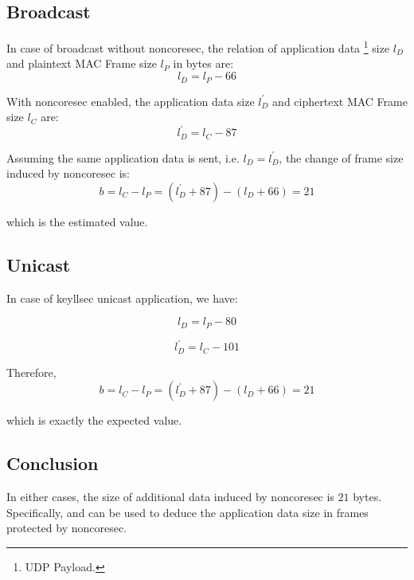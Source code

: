 \subsection{Broadcast}
In case of broadcast without noncoresec, the relation of application data \footnote{UDP Payload.} size $l_D$ and plaintext MAC Frame size $l_P$ in bytes are:
\begin{equation}
	l_D = l_{P} - 66
\end{equation}

With noncoresec enabled, the application data size $l^{\prime}_D$ and ciphertext MAC Frame size $l_C$ are:
\begin{equation} \label{Eq: broadcast llsec data size}
	l^{\prime}_D = l_{C} - 87
\end{equation}

Assuming the same application data is sent, i.e. $l_D = l^{\prime}_D$, the change of frame size induced by noncoresec is:
\begin{equation}
	b = l_C - l_P = (l^{\prime}_D + 87) - (l_D + 66) = 21
\end{equation}

which is the estimated value.

\subsection{Unicast}

In case of keyllsec unicast application, we have:

\begin{equation}
	l_D= l_P - 80
\end{equation}

\begin{equation} \label{Eq: unicast llsec data size}
	l^{\prime}_D = l_{C} - 101 
\end{equation}

Therefore, 
\begin{equation}
	b = l_C - l_P = (l^{\prime}_D + 87) - (l_D + 66) = 21
\end{equation}

which is exactly the expected value.

\subsection{Conclusion}

In either cases, the size of additional data induced by noncoresec is $21$ bytes. Specifically,  and  can be used to deduce the application data size in frames protected by noncoresec.

